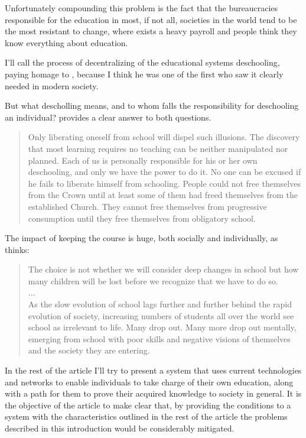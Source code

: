 Unfortunately compounding this problem is the fact that the bureaucracies
responsible for the education in most, if not all, societies in the world tend
to be the most resistant to change, where exists a heavy payroll and people
think they know everything about education. \cite{education:negroponte_speech_ted}

I'll call the process of decentralizing of the educational systems deschooling,
paying homage to \cite{education:ivan_illich__deschooling_society}, because I
think he was one of the first who saw it clearly needed in modern society. 

But what descholling means, and to whom falls the responsibility for deschooling
an individual? \cite{education:ivan_illich__deschooling_society} provides a
clear answer to both questions.

\begin{quotation}
    Only liberating oneself from school will dispel such illusions. The discovery
    that most learning requires no teaching can be neither manipulated nor planned.
    Each of us is personally responsible for his or her own deschooling, and only we
    have the power to do it. No one can be excused if he fails to liberate himself
    from schooling. People could not free themselves from the Crown until at least
    some of them had freed themselves from the established Church. They cannot free
    themselves from progressive consumption until they free themselves from
    obligatory school.
\end{quotation}

The impact of keeping the course is huge, both socially and individually, as
\cite{education:papert_gaston_vision_for_education} thinks: 

\begin{quotation} 
    The choice is not whether we will consider deep changes in school but how many
    children will be lost before we recognize that we have to do so.
\\
...
\\
    As the slow evolution of school lags further and further behind the rapid
    evolution of society, increasing numbers of students all over the world see
    school as irrelevant to life. Many drop out. Many more drop out mentally,
    emerging from school with poor skills and negative visions of themselves and the
    society they are entering.
\end{quotation}

In the rest of the article I'll try to present a system that uses current
technologies and networks to enable individuals to take charge of their own
education, along with a path for them to prove their acquired knowledge to society
in general. It is the objective of the article to make clear that, by providing
the conditions to a system with the characteristics outlined in the rest of the
article the problems described in this introduction would be considerably
mitigated.

